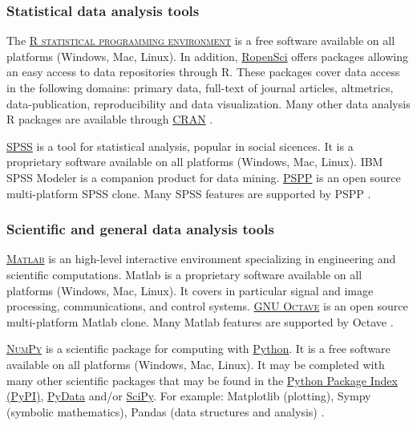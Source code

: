 \subsubsection{Statistical data analysis tools}
\noindent {} The \textsc{\href{http://r-project.org}{R statistical programming environment}} is a free software available on all platforms (Windows, Mac, Linux). In addition, \href{http://ropensci.org}{RopenSci} offers packages allowing an easy access to data repositories through R. These packages cover data access in the following domains: primary data, full-text of journal articles, altmetrics, data-publication, reproducibility and data visualization. Many other data analysis R packages are available through \href{http://cran.r-project.org/}{CRAN} \cite{ropensci.org_ropensci_2015,r_project_r:_2015}.

\vspace{0.4cm}

\noindent {} \textsc{\href{http://www.ibm.com/software/analytics/spss/}{SPSS}} is a tool for statistical analysis, popular in social sicences. It is a proprietary software available on all platforms (Windows, Mac, Linux). IBM SPSS Modeler is a companion product for data mining.  \textsc{\href{http://www.gnu.org/software/pspp/}{PSPP}} is an open source multi-platform SPSS clone. Many SPSS features are supported by PSPP \cite{ibm_ibm_2015,gnu_pspp_2015}.

\subsubsection{Scientific and general data analysis tools}
\noindent {} \textsc{\href{https://ch.mathworks.com/products/matlab/}{Matlab}} is an high-level interactive environment specializing in engineering and scientific computations. Matlab is a proprietary software available on all platforms (Windows, Mac, Linux). It covers in particular signal and image processing, communications, and control systems.  \textsc{\href{http://www.gnu.org/software/octave/}{GNU Octave}} is an open source multi-platform Matlab clone. Many Matlab features are supported by Octave \cite{gnu_gnu_2015,mathworks_matlab_2015}.

\vspace{0.4cm}

\noindent {}  \textsc{\href{http://www.numpy.org}{NumPy}} is a scientific package for computing with \href{http://www.python.org/}{Python}. It is a free software available on all platforms (Windows, Mac, Linux). It may be completed with many other scientific packages that may be found in the \href{https://pypi.python.org/pypi}{Python Package Index (PyPI)}, \href{http://pydata.org/downloads/}{PyData} and/or \href{http://www.scipy.org/}{SciPy}. For example: Matplotlib (plotting), Sympy (symbolic mathematics), Pandas (data structures and analysis) \cite{numpy_numpy_2015,python_software_foundation_python.org_2015,pydata_pydata.org_2015}.

